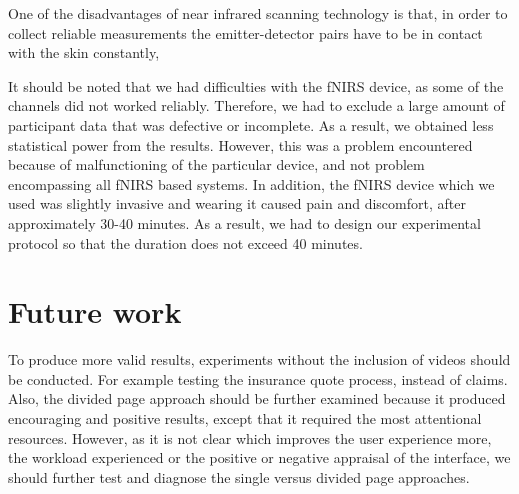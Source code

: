 \documentclass[a4paper]{report}
\begin{document}
		One of the disadvantages of near infrared scanning technology is that, in order to collect reliable measurements the emitter-detector pairs have to be in contact with the skin constantly, 
		
		It should be noted that we had difficulties with the fNIRS device, as some of the channels did not worked reliably. Therefore, we had to exclude a large amount of participant data that was defective or incomplete. As a result, we obtained less statistical power from the results. However, this was a problem encountered because of malfunctioning of the particular device, and not problem encompassing all fNIRS based systems. In addition, the fNIRS device which we used was slightly invasive and wearing it caused pain and discomfort, after approximately 30-40 minutes. As a result, we had to design our experimental protocol so that the duration does not exceed 40 minutes.

	\section{Future work}
		To produce more valid results, experiments without the inclusion of videos should be conducted. For example testing the insurance quote process, instead of claims. Also, the divided page approach should be further examined because it produced encouraging and positive results, except that it required the most attentional resources. However, as it is not clear which improves the user experience more, the workload experienced or the positive or negative appraisal of the interface, we should further test and diagnose the single versus divided page approaches.
\end{document}

